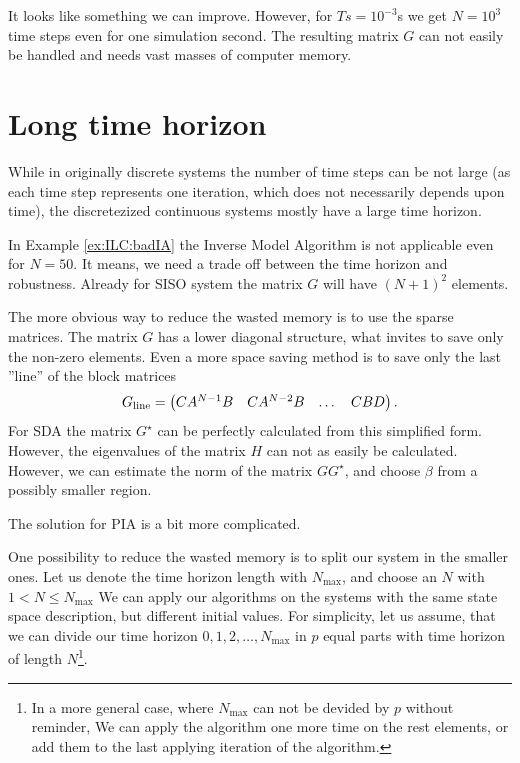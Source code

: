 \begin{exam}
It looks like something we can improve. However, for $Ts = 10^{-3}$s we get $N = 10^3$ time steps even for one simulation second. The resulting matrix $G$ can not easily be handled and needs vast masses of computer memory. 
\end{exam}

\section{Long time horizon}

	While in originally discrete systems the number of time steps can be not large (as each time step represents one iteration, which does not necessarily depends upon time), the discretezized continuous systems mostly have a large time horizon. 
	
	In Example \ref{ex:ILC:badIA} the Inverse Model Algorithm is not applicable even for $N = 50$. 
	It means, we need a trade off between the time horizon and robustness.
	Already for SISO system the matrix $G$ will have $(N + 1)^2$ elements. 
	
	The more obvious way to reduce the wasted memory is to use the sparse matrices. The matrix $G$ has a lower diagonal structure, what invites to save only the non-zero elements. Even a more space saving method is to save only the last ''line'' of the block matrices 
	\begin{align}
	G_{\rm{line}} = \begin{pmatrix}
	C A^{N-1} B & C A^{N-2} B & \dots & CB D
	\end{pmatrix}.
	\end{align}
	For SDA the matrix $G^\star$ can be perfectly calculated from this simplified form. However, the eigenvalues of the matrix $H$ can not as easily be calculated. However, we can estimate the norm of the matrix $G G^\star$, and choose $\beta$ from a possibly smaller region. 
	
	The solution for PIA  is a bit more complicated. 
	
	
	
	
	
	
	One possibility to reduce the wasted memory is to split our system in the smaller ones. Let us denote the time horizon length with $N_{\max}$, and choose an $N$ with $1<N\leq N_{\max}$
	We can apply our algorithms on the systems with the same state space description, but different initial values. For simplicity, let us assume, that we can divide our time horizon $0,1,2,\dots, N_{\max}$ in $p$ equal parts with time horizon of length $N$\footnote{In a more general case, where $N_{\max}$ can not be devided by $p$ without reminder, We can apply the algorithm one more time on the rest elements, or add them to the last applying iteration of the algorithm.}.  
	
